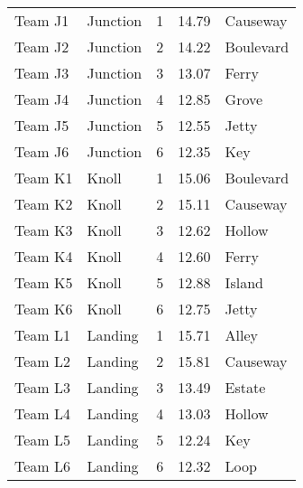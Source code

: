 \documentclass{article}%
\begin{document}
\begin{longtable}{|l|lcc|l|}
Team J1&Junction&1&14.79&Causeway\\%
Team J2&Junction&2&14.22&Boulevard\\%
Team J3&Junction&3&13.07&Ferry\\%
Team J4&Junction&4&12.85&Grove\\%
Team J5&Junction&5&12.55&Jetty\\%
Team J6&Junction&6&12.35&Key\\%
Team K1&Knoll&1&15.06&Boulevard\\%
Team K2&Knoll&2&15.11&Causeway\\%
Team K3&Knoll&3&12.62&Hollow\\%
Team K4&Knoll&4&12.60&Ferry\\%
Team K5&Knoll&5&12.88&Island\\%
Team K6&Knoll&6&12.75&Jetty\\%
Team L1&Landing&1&15.71&Alley\\%
Team L2&Landing&2&15.81&Causeway\\%
Team L3&Landing&3&13.49&Estate\\%
Team L4&Landing&4&13.03&Hollow\\%
Team L5&Landing&5&12.24&Key\\%
Team L6&Landing&6&12.32&Loop\\%
\end{longtable}%
\end{document}
